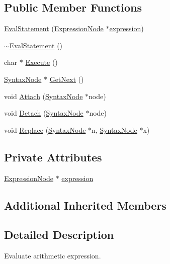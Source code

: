 \subsection*{Public Member Functions}
\begin{DoxyCompactItemize}
\item 
\hyperlink{classEvalStatement_aca4069dd093c588724a5516598ec413f}{Eval\+Statement} (\hyperlink{classExpressionNode}{Expression\+Node} $\ast$\hyperlink{classEvalStatement_a5fe66c1e5aea9236af19ad0bae09b01e}{expression})
\item 
\hyperlink{classEvalStatement_a448472b7904f2733d4b027b873ff6508}{$\sim$\+Eval\+Statement} ()
\item 
char $\ast$ \hyperlink{classEvalStatement_a6d3e0e2db3ed8cbdaa3250bf959a0be7}{Execute} ()
\item 
\hyperlink{classSyntaxNode}{Syntax\+Node} $\ast$ \hyperlink{classEvalStatement_acd7b7d1c82b17b819c899ae574681b79}{Get\+Next} ()
\item 
void \hyperlink{classEvalStatement_a1b689a777c3022a40d042410fc3fac77}{Attach} (\hyperlink{classSyntaxNode}{Syntax\+Node} $\ast$node)
\item 
void \hyperlink{classEvalStatement_a64257c56418096b0615280fe19008f88}{Detach} (\hyperlink{classSyntaxNode}{Syntax\+Node} $\ast$node)
\item 
void \hyperlink{classEvalStatement_a9b77319533fab13e48c720b47a4d26b7}{Replace} (\hyperlink{classSyntaxNode}{Syntax\+Node} $\ast$n, \hyperlink{classSyntaxNode}{Syntax\+Node} $\ast$x)
\end{DoxyCompactItemize}
\subsection*{Private Attributes}
\begin{DoxyCompactItemize}
\item 
\hyperlink{classExpressionNode}{Expression\+Node} $\ast$ \hyperlink{classEvalStatement_a5fe66c1e5aea9236af19ad0bae09b01e}{expression}
\end{DoxyCompactItemize}
\subsection*{Additional Inherited Members}


\subsection{Detailed Description}
Evaluate arithmetic expression. 

